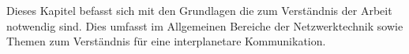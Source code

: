 \label{cap:grundlagen}
Dieses Kapitel befasst sich mit den Grundlagen die zum Verst{\"a}ndnis der
Arbeit notwendig sind. Dies umfasst im Allgemeinen Bereiche der
Netzwerktechnik sowie Themen zum Verständnis f{\"u}r eine interplanetare
Kommunikation.
